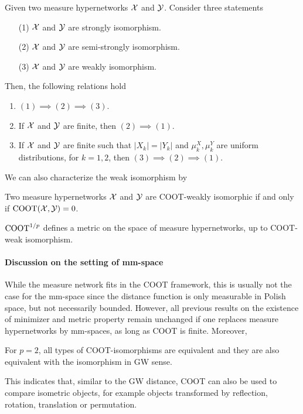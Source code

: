 \begin{corollary} \label{prop:strong_weak_iso}
  Given two measure hypernetworks $\mathcal X$ and $\mathcal Y$. Consider three statements
  \begin{enumerate}
    \item[(1)] $\mathcal X$ and $\mathcal Y$ are strongly isomorphism.
    \item[(2)] $\mathcal X$ and $\mathcal Y$ are semi-strongly isomorphism.
    \item[(3)] $\mathcal X$ and $\mathcal Y$ are weakly isomorphism.
  \end{enumerate}
  Then, the following relations hold
  \begin{enumerate}
    \item $(1) \implies (2) \implies (3)$.
    \item If $\mathcal X$ and $\mathcal Y$ are finite, then $(2) \implies (1)$.
    \item If $\mathcal X$ and $\mathcal Y$ are finite such that $|X_k| = |Y_k|$
    and $\mu_k^X, \mu_k^Y$ are uniform distributions, for $k = 1,2$, then
    $(3) \implies (2) \implies (1)$.
  \end{enumerate}
\end{corollary}
We can also characterize the weak isomorphism by
\begin{proposition} \label{prop:coot_iso}
  Two measure hypernetworks $\mathcal X$ and $\mathcal Y$ are COOT-weakly isomorphic if and only if
  $\text{COOT}(\mathcal X, \mathcal Y) = 0$.
\end{proposition}
\begin{proposition} \label{prop:metric_prop}
  $\text{COOT}^{1/p}$ defines a metric on the space of measure hypernetworks, up to COOT-weak isomorphism.
\end{proposition}
\paragraph{Discussion on the setting of mm-space}
While the measure network fits in the COOT framework, this is usually not the case for
the mm-space since the distance function is only measurable in Polish space,
but not necessarily bounded. However, all previous results on the existence of minimizer and
metric property remain unchanged if one replaces measure hypernetworks by mm-spaces,
as long as COOT is finite. Moreover,
\begin{corollary}
For $p=2$, all types of COOT-isomorphisms are equivalent and
they are also equivalent with the isomorphism in GW sense.
\end{corollary}
This indicates that, similar to the GW distance, COOT can also be used to compare isometric objects,
for example objects transformed by reflection, rotation, translation or permutation.

